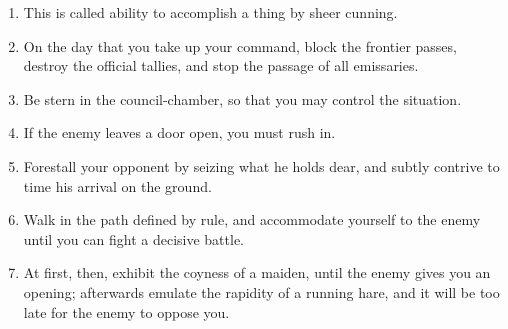 \documentclass[oneside]{book}
\begin{document}
\begin{enumerate}
	\item This is called ability to accomplish a thing by sheer cunning.
	\item On the day that you take up your command, block the frontier passes, destroy the official tallies, and stop the passage of all emissaries.
	\item Be stern in the council-chamber, so that you may control the situation.
	\item If the enemy leaves a door open, you must rush in.
	\item Forestall your opponent by seizing what he holds dear, and subtly contrive to time his arrival on the ground.
	\item Walk in the path defined by rule, and accommodate yourself to the enemy until you can fight a decisive battle.
	\item At first, then, exhibit the coyness of a maiden, until the enemy gives you an opening; afterwards emulate the rapidity of a running hare, and it will be too late for the enemy to oppose you.
\end{enumerate}
\end{document}
